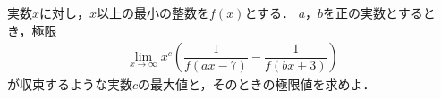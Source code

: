 \documentclass[../../main.tex]{subfiles}
\begin{document}
実数$x$に対し，$x$以上の最小の整数を$f(x)$とする．
$a$，$b$を正の実数とするとき，極限
\begin{align}
  \lim_{x\to\infty} x^c \left( \dfrac{1}{f(ax-7)}-\dfrac{1}{f(bx+3)} \right)
\end{align}
が収束するような実数$c$の最大値と，そのときの極限値を求めよ．
\end{document}
